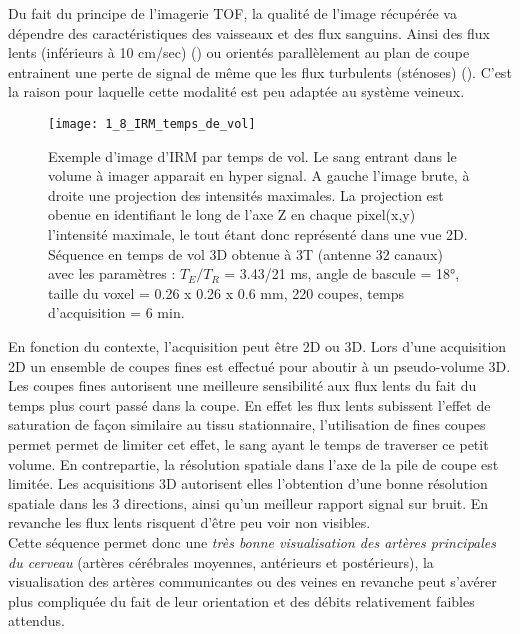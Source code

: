 Du fait du principe de l’imagerie TOF, la qualité de l’image récupérée va dépendre des caractéristiques des vaisseaux et des flux sanguins. Ainsi des flux lents (inférieurs à 10 cm/sec) (\cite{Offerman2011})  ou orientés parallèlement au plan de coupe entrainent une perte de signal de même que les flux turbulents (sténoses) (\cite{Bradley1984}). C’est la raison pour laquelle cette modalité est peu adaptée au système veineux.\\
\begin{figure}[!t]
\centering
\texttt{[image: 1\_8\_IRM\_temps\_de\_vol]}
\caption{Exemple d'image d'IRM par temps de vol. Le sang entrant dans le volume à imager apparait en hyper signal. A gauche l’image brute, à droite une projection des intensités maximales. La projection est obenue en identifiant le long de l'axe Z en chaque pixel(x,y) l'intensité maximale, le tout étant donc représenté dans une vue 2D. Séquence en temps de vol 3D obtenue à 3T (antenne 32 canaux) avec les paramètres : $T_E/T_R$ = 3.43/21 ms, angle de bascule = 18°, taille du voxel = 0.26 x 0.26 x 0.6 mm, 220 coupes, temps d'acquisition = 6 min.}
\label{fig:1_8_IRM_temps_de_vol}	
\end{figure}
En fonction du contexte, l’acquisition peut être 2D ou 3D. Lors d’une acquisition 2D un ensemble de coupes fines est effectué pour aboutir à un pseudo-volume 3D. Les coupes fines autorisent une meilleure sensibilité aux flux lents du fait du temps plus court passé dans la coupe. En effet les flux lents subissent l'effet de saturation de façon similaire au tissu stationnaire, l'utilisation de fines coupes permet permet de limiter cet effet, le sang ayant le temps de traverser ce petit volume. En contrepartie, la résolution spatiale dans l’axe de la pile de coupe est limitée. Les acquisitions 3D autorisent elles l’obtention d’une bonne résolution spatiale dans les 3 directions, ainsi qu’un meilleur rapport signal sur bruit. En revanche les flux lents risquent d’être peu voir non visibles.\\
Cette séquence permet donc une {\em très bonne visualisation des artères principales du cerveau} (artères cérébrales moyennes, antérieurs et postérieurs), la visualisation des artères communicantes ou des veines en revanche peut s’avérer plus compliquée du fait de leur orientation et des débits relativement faibles attendus.
